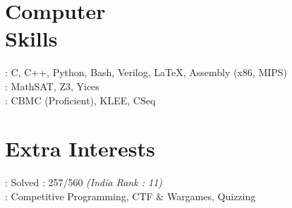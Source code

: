 \documentclass[mm]{simple_style}
\begin{document}
\begin{resume}
\section{Computer\\Skills}
: C, C++, Python, Bash, Verilog, \LaTeX, Assembly (x86, MIPS)
\\
: MathSAT, Z3, Yices
\\
: CBMC (Proficient), KLEE, CSeq

\vspace{-2ex}
\sectionline

\section{Extra Interests}
: Solved : 257/560 \textit{(India Rank : 11)}\\
: Competitive Programming, CTF \& Wargames, Quizzing
\end{resume}
\end{document}
